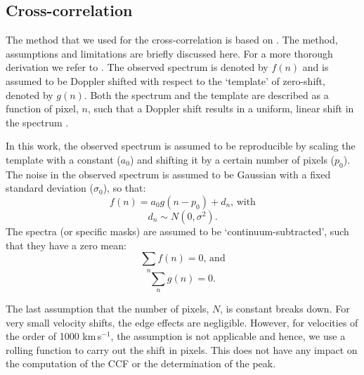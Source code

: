 \subsection{Cross-correlation}
The method that we used for the cross-correlation is based on \citet{zucker_cross-correlation_2003}. The method, assumptions and limitations are briefly discussed here. For a more thorough derivation we refer to \citet{zucker_cross-correlation_2003}. The observed spectrum is denoted by $f(n)$ and is assumed to be Doppler shifted with respect to the `template' of zero-shift, denoted by $g(n)$. Both the spectrum and the template are described as a function of pixel, $n$, such that a Doppler shift results in a uniform, linear shift in the spectrum \citep{tonry_survey_1979}. 

In this work, the observed spectrum is assumed to be reproducible by scaling the template with a constant ($a_0$) and shifting it by a certain number of pixels ($p_0$). The noise in the observed spectrum is assumed to be Gaussian with a fixed standard deviation ($\sigma_0$), so that:
\begin{equation}
f(n) = a_0 g(n-p_0) + d_n \textrm{, with}
\end{equation}
\begin{equation}
d_n \sim N(0,\sigma^2) \textrm{.}
\end{equation}
The spectra (or specific masks) are assumed to be `continuum-subtracted', such that they have a zero mean:
\begin{equation}
\sum_n f(n) = 0 \textrm{, and}
\end{equation}
\begin{equation}
\sum_n g(n) = 0 \textrm{.}
\end{equation}

The last assumption that the number of pixels, $N$, is constant breaks down. For very small velocity shifts, the edge effects are negligible. However, for velocities of the order of 1000 km\,s$^{-1}$, the assumption is not applicable and hence, we use a rolling function to carry out the shift in pixels. This does not have any impact on the computation of the CCF or the determination of the peak. 

